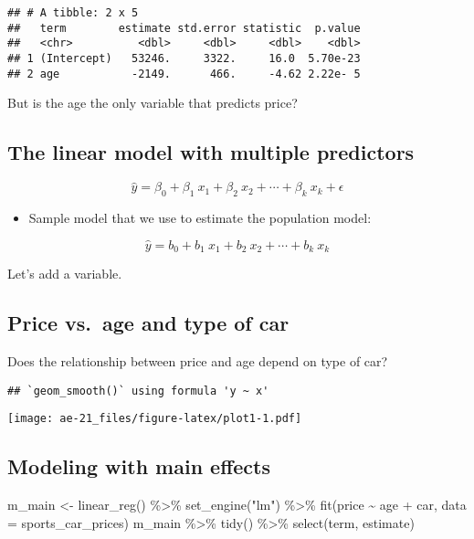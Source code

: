 \documentclass[
]{article}
\newenvironment{Shaded}{\begin{snugshade}}{\end{snugshade}}
\newcommand{\AttributeTok}[1]{\textcolor[rgb]{0.77,0.63,0.00}{#1}}
\newcommand{\FunctionTok}[1]{\textcolor[rgb]{0.00,0.00,0.00}{#1}}
\newcommand{\NormalTok}[1]{#1}
\newcommand{\OtherTok}[1]{\textcolor[rgb]{0.56,0.35,0.01}{#1}}
\newcommand{\SpecialCharTok}[1]{\textcolor[rgb]{0.00,0.00,0.00}{#1}}
\newcommand{\StringTok}[1]{\textcolor[rgb]{0.31,0.60,0.02}{#1}}
\providecommand{\tightlist}{%
  \setlength{\itemsep}{0pt}\setlength{\parskip}{0pt}}
\begin{document}
\begin{verbatim}
## # A tibble: 2 x 5
##   term        estimate std.error statistic  p.value
##   <chr>          <dbl>     <dbl>     <dbl>    <dbl>
## 1 (Intercept)   53246.     3322.     16.0  5.70e-23
## 2 age           -2149.      466.     -4.62 2.22e- 5
\end{verbatim}

But is the age the only variable that predicts price?

\hypertarget{the-linear-model-with-multiple-predictors}{%
\subsection{The linear model with multiple
predictors}\label{the-linear-model-with-multiple-predictors}}

\[ \hat{y} = \beta_0 + \beta_1~x_1 + \beta_2~x_2 + \cdots + \beta_k~x_k +\epsilon \]

\begin{itemize}
\tightlist
\item
  Sample model that we use to estimate the population model:
\end{itemize}

\[ \hat{y} = b_0 + b_1~x_1 + b_2~x_2 + \cdots + b_k~x_k \]

Let's add a variable.

\hypertarget{price-vs.-age-and-type-of-car}{%
\subsection{Price vs.~age and type of
car}\label{price-vs.-age-and-type-of-car}}

Does the relationship between price and age depend on type of car?

\begin{verbatim}
## `geom_smooth()` using formula 'y ~ x'
\end{verbatim}

\texttt{[image: ae-21\_files/figure-latex/plot1-1.pdf]}

\hypertarget{modeling-with-main-effects}{%
\subsection{Modeling with main
effects}\label{modeling-with-main-effects}}

\begin{Shaded}
\begin{Highlighting}[]
\NormalTok{m\_main }\OtherTok{\textless{}{-}} \FunctionTok{linear\_reg}\NormalTok{() }\SpecialCharTok{\%\textgreater{}\%}
  \FunctionTok{set\_engine}\NormalTok{(}\StringTok{"lm"}\NormalTok{) }\SpecialCharTok{\%\textgreater{}\%}
  \FunctionTok{fit}\NormalTok{(price }\SpecialCharTok{\textasciitilde{}}\NormalTok{ age }\SpecialCharTok{+}\NormalTok{ car, }\AttributeTok{data =}\NormalTok{ sports\_car\_prices)}
\NormalTok{m\_main }\SpecialCharTok{\%\textgreater{}\%}
  \FunctionTok{tidy}\NormalTok{() }\SpecialCharTok{\%\textgreater{}\%}
  \FunctionTok{select}\NormalTok{(term, estimate)}
\end{Highlighting}
\end{Shaded}
\end{document}
